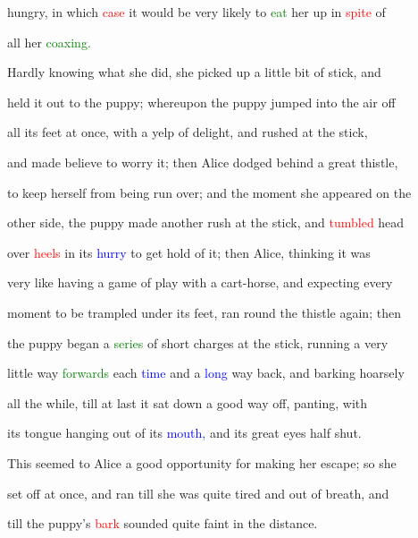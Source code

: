  \textcolor{BurntOrange}{hungry,} in which \textcolor{red}{case} it would be very likely to \textcolor{green}{eat} her up in \textcolor{red}{spite} of

 all her \textcolor{green}{coaxing.}



 Hardly knowing what she did, she picked up a little bit of stick, and

 held it out to the \textcolor{BurntOrange}{puppy;} whereupon the \textcolor{BurntOrange}{puppy} jumped into the air off

 all its feet at once, with a \textcolor{BurntOrange}{yelp} of \textcolor{BurntOrange}{delight,} and rushed at the stick,

 and made believe to \textcolor{BurntOrange}{worry} it; then Alice dodged behind a great thistle,

 to keep herself from being run over; and the moment she appeared on the

 other side, the \textcolor{BurntOrange}{puppy} made another rush at the stick, and \textcolor{red}{tumbled} head

 over \textcolor{red}{heels} in its \textcolor{blue}{hurry} to get hold of it; then Alice, thinking it was

 very like having a game of play with a cart-horse, and \textcolor{BurntOrange}{expecting} every

 moment to be trampled under its feet, ran round the thistle again; then

 the \textcolor{BurntOrange}{puppy} began a \textcolor{green}{series} of short charges at the stick, running a very

 little way \textcolor{green}{forwards} each \textcolor{blue}{time} and a \textcolor{blue}{long} way back, and barking hoarsely

 all the while, till at last it sat down a \textcolor{BurntOrange}{good} way off, panting, with

 its tongue hanging out of its \textcolor{blue}{mouth,} and its great eyes half shut.



 This seemed to Alice a \textcolor{BurntOrange}{good} \textcolor{BurntOrange}{opportunity} for making her \textcolor{BurntOrange}{escape;} so she

 set off at once, and ran till she was quite tired and out of breath, and

 till the \textcolor{BurntOrange}{puppy’s} \textcolor{red}{bark} sounded quite faint in the distance.



